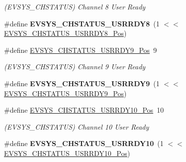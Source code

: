 \begin{DoxyCompactItemize}
\begin{DoxyCompactList}\small\item\em (E\+V\+S\+Y\+S\+\_\+\+C\+H\+S\+T\+A\+T\+U\+S) Channel 8 User Ready \end{DoxyCompactList}\item 
\hypertarget{group___s_a_m_l21___e_v_s_y_s_gadd9629d41bab576ff87abf6123f66639}{}\#define {\bfseries E\+V\+S\+Y\+S\+\_\+\+C\+H\+S\+T\+A\+T\+U\+S\+\_\+\+U\+S\+R\+R\+D\+Y8}~(1 $<$$<$ \hyperlink{group___s_a_m_l21___e_v_s_y_s_gaa405e16558d697c39b0af7b20b416ce9}{E\+V\+S\+Y\+S\+\_\+\+C\+H\+S\+T\+A\+T\+U\+S\+\_\+\+U\+S\+R\+R\+D\+Y8\+\_\+\+Pos})\label{group___s_a_m_l21___e_v_s_y_s_gadd9629d41bab576ff87abf6123f66639}

\item 
\hypertarget{group___s_a_m_l21___e_v_s_y_s_ga23200e4a43d2c8ad259e115182188c29}{}\#define \hyperlink{group___s_a_m_l21___e_v_s_y_s_ga23200e4a43d2c8ad259e115182188c29}{E\+V\+S\+Y\+S\+\_\+\+C\+H\+S\+T\+A\+T\+U\+S\+\_\+\+U\+S\+R\+R\+D\+Y9\+\_\+\+Pos}~9\label{group___s_a_m_l21___e_v_s_y_s_ga23200e4a43d2c8ad259e115182188c29}

\begin{DoxyCompactList}\small\item\em (E\+V\+S\+Y\+S\+\_\+\+C\+H\+S\+T\+A\+T\+U\+S) Channel 9 User Ready \end{DoxyCompactList}\item 
\hypertarget{group___s_a_m_l21___e_v_s_y_s_ga9c5e83a444e2bd5d32dcc6ab09d7bcd6}{}\#define {\bfseries E\+V\+S\+Y\+S\+\_\+\+C\+H\+S\+T\+A\+T\+U\+S\+\_\+\+U\+S\+R\+R\+D\+Y9}~(1 $<$$<$ \hyperlink{group___s_a_m_l21___e_v_s_y_s_ga23200e4a43d2c8ad259e115182188c29}{E\+V\+S\+Y\+S\+\_\+\+C\+H\+S\+T\+A\+T\+U\+S\+\_\+\+U\+S\+R\+R\+D\+Y9\+\_\+\+Pos})\label{group___s_a_m_l21___e_v_s_y_s_ga9c5e83a444e2bd5d32dcc6ab09d7bcd6}

\item 
\hypertarget{group___s_a_m_l21___e_v_s_y_s_ga5c6977bb4bff519e09f9396b503c3ddc}{}\#define \hyperlink{group___s_a_m_l21___e_v_s_y_s_ga5c6977bb4bff519e09f9396b503c3ddc}{E\+V\+S\+Y\+S\+\_\+\+C\+H\+S\+T\+A\+T\+U\+S\+\_\+\+U\+S\+R\+R\+D\+Y10\+\_\+\+Pos}~10\label{group___s_a_m_l21___e_v_s_y_s_ga5c6977bb4bff519e09f9396b503c3ddc}

\begin{DoxyCompactList}\small\item\em (E\+V\+S\+Y\+S\+\_\+\+C\+H\+S\+T\+A\+T\+U\+S) Channel 10 User Ready \end{DoxyCompactList}\item 
\hypertarget{group___s_a_m_l21___e_v_s_y_s_ga3dc3a404f657c2577b3805283b0b8a31}{}\#define {\bfseries E\+V\+S\+Y\+S\+\_\+\+C\+H\+S\+T\+A\+T\+U\+S\+\_\+\+U\+S\+R\+R\+D\+Y10}~(1 $<$$<$ \hyperlink{group___s_a_m_l21___e_v_s_y_s_ga5c6977bb4bff519e09f9396b503c3ddc}{E\+V\+S\+Y\+S\+\_\+\+C\+H\+S\+T\+A\+T\+U\+S\+\_\+\+U\+S\+R\+R\+D\+Y10\+\_\+\+Pos})\label{group___s_a_m_l21___e_v_s_y_s_ga3dc3a404f657c2577b3805283b0b8a31}


\end{DoxyCompactItemize}
